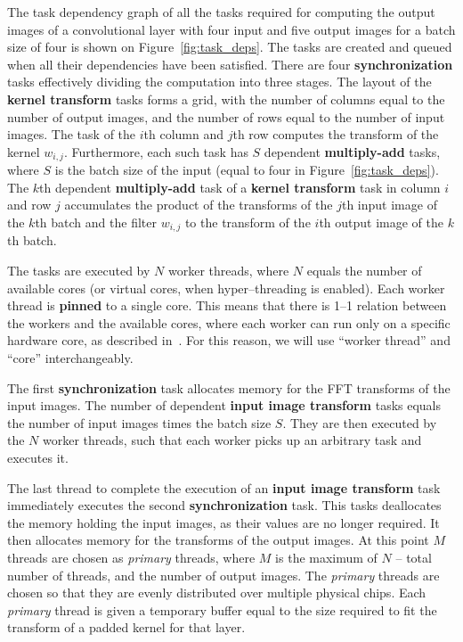 \documentclass[conference]{./IEEEtran/IEEEtran}
\begin{document}
  {\color{zblack}}

  The task dependency graph of all the tasks required for computing
  the output images of a convolutional layer with four input and five
  output images for a batch size of four is shown on
  Figure~\ref{fig:task_deps}.  The tasks are created and queued when
  all their dependencies have been satisfied.  There are four
  {\color{zyellow}\bf synchronization} tasks effectively dividing the
  computation into three stages.  The layout of the {\color{zblue}\bf
    kernel transform} tasks forms a grid, with the number of columns
  equal to the number of output images, and the number of rows
  equal to the number of input images.  The task of the $i$th
  column and $j$th row computes the transform of the kernel $w_{i,j}$.
  Furthermore, each such task has $S$ dependent {\color{zgreen}\bf
    multiply-add} tasks, where $S$ is the batch size of the input
  (equal to four in Figure~\ref{fig:task_deps}).  The $k$th dependent
  {\color{zgreen}\bf multiply-add} task of a {\color{zblue}\bf kernel
    transform} task in column $i$ and row $j$ accumulates the product
  of the transforms of the $j$th input image of the $k$th batch and
  the filter $w_{i,j}$ to the transform of the $i$th output image of
  the $k$th batch.

  The tasks are executed by $N$ worker threads, where $N$ equals the
  number of available cores (or virtual cores, when hyper--threading
  is enabled).  Each worker thread is {\bf pinned} to a single core.
  This means that there is 1--1 relation between the workers and the
  available cores, where each worker can run only on a specific
  hardware core, as described in~\cite{jeffers2015high}.  For this
  reason, we will use ``worker thread'' and ``core'' interchangeably.

  The first {\color{zyellow}\bf synchronization} task allocates memory
  for the FFT transforms of the input images.  The number of dependent
  {\color{zred}\bf input image transform} tasks equals the number of
  input images times the batch size $S$.  They are then
  executed by the $N$ worker threads, such that each worker picks up
  an arbitrary task and executes it.

  The last thread to complete the execution of an {\color{zred}\bf
    input image transform} task immediately executes the second
  {\color{zyellow}\bf synchronization} task.  This tasks deallocates
  the memory holding the input images, as their values are no longer
  required. It then allocates memory for the transforms of the output
  images.  At this point $M$ threads are chosen as \emph{primary}
  threads, where $M$ is the maximum of $N$ -- total number of threads,
  and the number of output images.  The \emph{primary} threads
  are chosen so that they are evenly distributed over multiple
  physical chips.  Each \emph{primary} thread is given a temporary
  buffer equal to the size required to fit the transform of a padded
  kernel for that layer.
\end{document}
